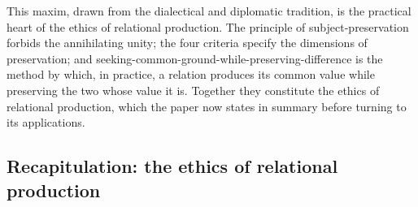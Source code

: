 This maxim, drawn from the dialectical and diplomatic tradition, is the practical heart of the ethics of relational production. The principle of subject-preservation forbids the annihilating unity; the four criteria specify the dimensions of preservation; and seeking-common-ground-while-preserving-difference is the method by which, in practice, a relation produces its common value while preserving the two whose value it is. Together they constitute the ethics of relational production, which the paper now states in summary before turning to its applications.

\subsection{Recapitulation: the ethics of relational production}
\label{p21:sub:rp-recap}

